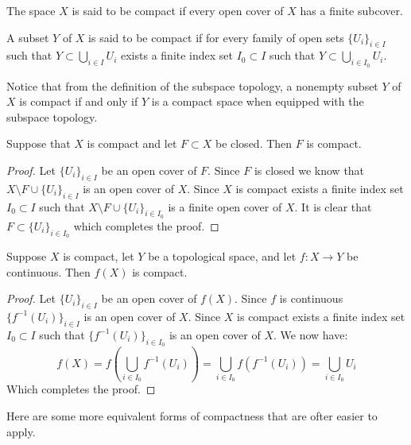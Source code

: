 \documentclass[11pt,a4paper]{article}
\begin{document}
\begin{definition}[Compact]
  The space $X$ is said to be compact if every open cover of $X$
  has a finite subcover.
\end{definition}

\begin{definition}
  A subset $Y$ of $X$ is said to be compact if for every family of open
  sets $\{U_i\}_{i \in I}$ such that $Y \subset \bigcup_{i \in I} U_i$
  exists a finite index set $I_0 \subset I$ such that 
  $Y \subset \bigcup_{i \in I_0} U_i$.
\end{definition}

\begin{remark}
  Notice that from the definition of the subspace topology,
  a nonempty subset $Y$ of $X$ is compact if and only if $Y$ is a 
  compact space when equipped with the subspace topology.
\end{remark}

\begin{proposition}
  Suppose that $X$ is compact and let $F \subset X$ be closed. Then
  $F$ is compact.
\end{proposition}
\begin{proof}
  Let $\{U_i\}_{i \in I}$ be an open cover of $F$. Since $F$ is closed
  we know that $X \setminus F \cup \{U_i\}_{i \in I}$ is an open cover
  of $X$. Since $X$ is compact exists a finite index set $I_0 \subset I$
  such that $X \setminus F \cup \{U_i\}_{i \in I_0}$ is a finite
  open cover of $X$. It is clear that $F \subset \{U_i\}_{i \in I_0}$
  which completes the proof.
\end{proof}

\begin{proposition}
  Suppose $X$ is compact, let $Y$ be a topological space, and let
  $f \colon X \to Y$ be continuous. Then $f(X)$ is compact.
\end{proposition}
\begin{proof}
  Let $\{U_i\}_{i \in I}$ be an open cover of $f(X)$. Since $f$
  is continuous $\{f^{-1}(U_i)\}_{i \in I}$ is an open cover of $X$.
  Since $X$ is compact exists a finite index set $I_0 \subset I$
  such that $\{f^{-1}(U_i)\}_{i \in I_0}$ is an open cover of $X$.
  We now have:
  \[
    f(X) = f\left(\bigcup_{i \in I_0} f^{-1}(U_i)\right) = 
    \bigcup_{i \in I_0} f(f^{-1}(U_i)) = 
    \bigcup_{i \in I_0} U_i
  \]
  Which completes the proof.
\end{proof}

Here are some more equivalent forms of compactness that are ofter easier
to apply.
\end{document}
